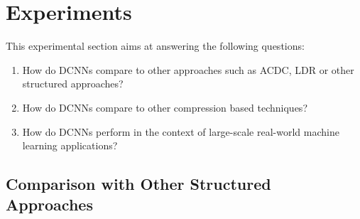 \section{Experiments}
\label{section:ch4-experiments}

This experimental section aims at answering the following questions:
\begin{enumerate}
    \itshape
    \item How do DCNNs compare to other approaches such as ACDC, LDR or other structured approaches?
    \item How do DCNNs compare to other compression based techniques?
    \item How do DCNNs perform in the context of large-scale real-world machine learning applications?  
\end{enumerate}


\subsection{Comparison with Other Structured Approaches}
\label{subsection:ch4-comparison_with_other_structured_approches}




